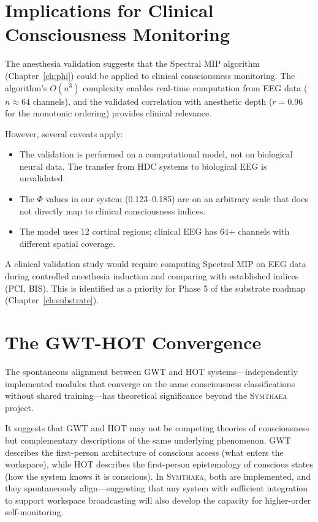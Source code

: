\documentclass[12pt]{book}
\newcommand{\symthaea}{\textsc{Symthaea}}
\begin{document}
\section{Implications for Clinical Consciousness Monitoring}

The anesthesia validation suggests that the Spectral MIP algorithm (Chapter~\ref{ch:phi}) could be applied to clinical consciousness monitoring. The algorithm's $O(n^3)$ complexity enables real-time computation from EEG data ($n \approx 64$ channels), and the validated correlation with anesthetic depth ($r = 0.96$ for the monotonic ordering) provides clinical relevance.

However, several caveats apply:
\begin{itemize}
  \item The validation is performed on a computational model, not on biological neural data. The transfer from HDC systems to biological EEG is unvalidated.
  \item The $\Phi$ values in our system (0.123--0.185) are on an arbitrary scale that does not directly map to clinical consciousness indices.
  \item The model uses 12 cortical regions; clinical EEG has 64+ channels with different spatial coverage.
\end{itemize}

A clinical validation study would require computing Spectral MIP on EEG data during controlled anesthesia induction and comparing with established indices (PCI, BIS). This is identified as a priority for Phase 5 of the substrate roadmap (Chapter~\ref{ch:substrate}).

\section{The GWT-HOT Convergence}

The spontaneous alignment between GWT and HOT systems---independently implemented modules that converge on the same consciousness classifications without shared training---has theoretical significance beyond the \symthaea{} project.

It suggests that GWT and HOT may not be competing theories of consciousness but complementary descriptions of the same underlying phenomenon. GWT describes the first-person architecture of conscious access (what enters the workspace), while HOT describes the first-person epistemology of conscious states (how the system knows it is conscious). In \symthaea{}, both are implemented, and they spontaneously align---suggesting that any system with sufficient integration to support workspace broadcasting will also develop the capacity for higher-order self-monitoring.
\end{document}
